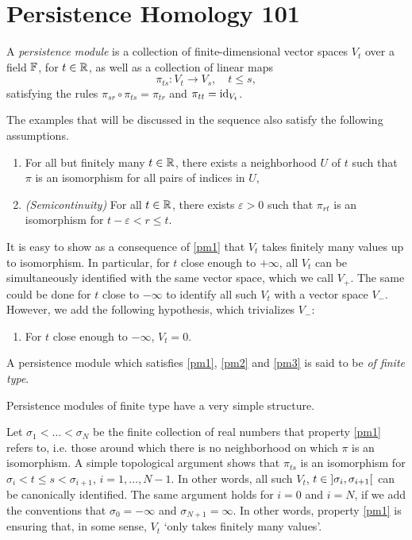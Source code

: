 \chapter{Persistence Homology 101}

\begin{definition}
A \emph{persistence module} is a collection of finite-dimensional vector spaces $V_t$ over a field $\mathbb{F}$, for $t \in \mathbb{R}$, as well as a collection of linear maps
\begin{equation}
\pi_{ts} \colon V_t \to V_s, \quad t\leq s,
\end{equation}
satisfying the rules $\pi_{sr} \circ \pi_{ts} = \pi_{tr}$ and $\pi_{tt} = \mathrm{id}_{V_t}$.

The examples that will be discussed in the sequence also satisfy the following assumptions.
\begin{enumerate}[label=\roman*)]
\item\label{pm1} For all but finitely many $t \in \mathbb{R}$, there exists a neighborhood $U$ of $t$ such that $\pi$ is an isomorphism for all pairs of indices in $U$,
\item\label{pm2} \textit{(Semicontinuity)} For all $t \in \mathbb{R}$, there exists $\varepsilon > 0$ such that $\pi_{rt}$ is an isomorphism for $t-\varepsilon < r \leq t$.
\end{enumerate}

It is easy to show as a consequence of \ref{pm1} that $V_t$ takes finitely many values up to isomorphism. In particular, for $t$ close enough to $+\infty$, all $V_t$ can be simultaneously identified with the same vector space, which we call $V_+$. The same could be done for $t$ close to $-\infty$ to identify all such $V_t$ with a vector space $V_-$. However, we add the following hypothesis, which trivializes $V_-$:

\begin{enumerate}[resume*]
\item\label{pm3} For $t$ close enough to $-\infty$, $V_t = 0$.
\end{enumerate}

A persistence module which satisfies \ref{pm1}, \ref{pm2} and \ref{pm3} is said to be \emph{of finite type}.
\end{definition}

Persistence modules of finite type have a very simple structure.

Let $\sigma_1 < \dots < \sigma_N$ be the finite collection of real numbers that property \ref{pm1} refers to, i.e. those around which there is no neighborhood on which $\pi$ is an isomorphism. A simple topological argument shows that $\pi_{ts}$ is an isomorphism for $\sigma_i < t \leq s < \sigma_{i+1}$, $i = 1, \dots, N-1$. In other words, all such $V_t$, $t \in \ointerval{\sigma_i}{\sigma_{i+1}}$ can be canonically identified. The same argument holds for $i = 0$ and $i = N$, if we add the conventions that $\sigma_0 = -\infty$ and $\sigma_{N+1} = \infty$. In other words, property \ref{pm1} is ensuring that, in some sense, $V_t$ `only takes finitely many values'.

